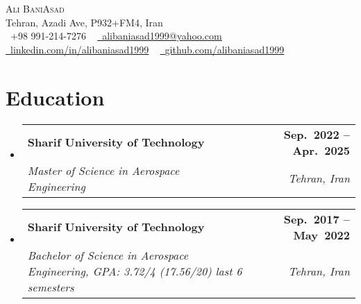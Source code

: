 \documentclass[letterpaper,11pt]{article}
\makeatletter
\newcommand{\resumeSubheading}[4]{
  \vspace{-2pt}\item
    \begin{tabular*}{1.0\textwidth}[t]{l@{\extracolsep{\fill}}r}
      \textbf{ #1} & \textbf{\small #2} \\
      \textsl{\small #3} & \textit{\small #4} \\
    \end{tabular*}\vspace{-7pt}
}
\newcommand{\resumeSubHeadingListStart}{\begin{itemize}[leftmargin=0.0in, label={}]}
\newcommand{\resumeSubHeadingListEnd}{\end{itemize}}
\makeatother
\begin{document}
\begin{center}
    {\Huge \scshape Ali BaniAsad} \\ \vspace{1pt}
    Tehran, Azadi Ave, P932+FM4, Iran \\ \vspace{1pt}
    \small \raisebox{-0.1\height}\faPhone\ +98 991-214-7276 ~ \href{mailto:alibaniasad1999@yahoo.com}{\raisebox{-0.2\height}\faEnvelope\  \underline{alibaniasad1999@yahoo.com}} ~
    \href{https://linkedin.com/in/alibaniasad1999/}{\raisebox{-0.2\height}\faLinkedin\ \underline{linkedin.com/in/alibaniasad1999}}  ~
    \href{https://github.com/alibaniasad1999}{\raisebox{-0.2\height}\faGithub\ \underline{github.com/alibaniasad1999}}
    \vspace{-8pt}
\end{center}


\section{Education}
  \resumeSubHeadingListStart

  \resumeSubheading
  {Sharif University of Technology}{Sep.\ 2022 -- Apr.\ 2025
  }
  {Master of Science in Aerospace Engineering}{Tehran, Iran}
  \vspace{-3pt}

    \resumeSubheading
      {Sharif University of Technology}{Sep.\ 2017 -- May\ 2022
      }
      {Bachelor of Science in Aerospace Engineering,
      GPA: 3.72/4 (17.56/20) last 6 semesters
      }{Tehran, Iran}



  \resumeSubHeadingListEnd


 \vspace{-18pt}
\end{document}
